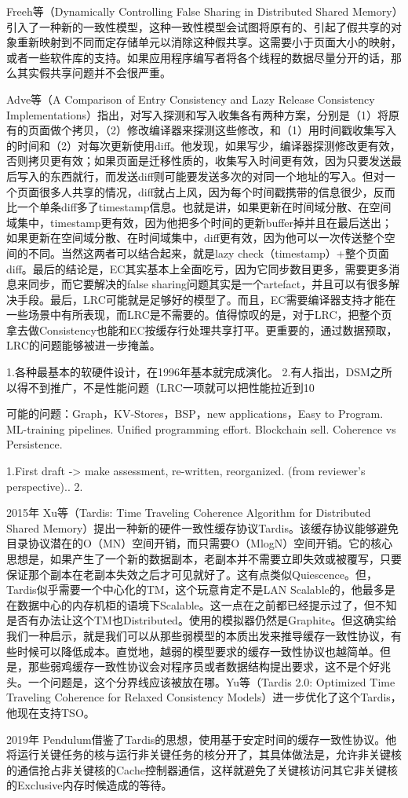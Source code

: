 \documentclass[a4paper,twoside]{scrbook}
\begin{document}
Freeh等（Dynamically Controlling False Sharing in Distributed Shared Memory）引入了一种新的一致性模型，这种一致性模型会试图将原有的、引起了假共享的对象重新映射到不同而定存储单元以消除这种假共享。这需要小于页面大小的映射，或者一些软件库的支持。如果应用程序编写者将各个线程的数据尽量分开的话，那么其实假共享问题并不会很严重。

Adve等（A Comparison of Entry Consistency and Lazy Release Consistency Implementations）指出，对写入探测和写入收集各有两种方案，分别是（1）将原有的页面做个拷贝，（2）修改编译器来探测这些修改，和（1）用时间戳收集写入的时间和（2）对每次更新使用diff。他发现，如果写少，编译器探测修改更有效，否则拷贝更有效；如果页面是迁移性质的，收集写入时间更有效，因为只要发送最后写入的东西就行，而发送diff则可能要发送多次的对同一个地址的写入。但对一个页面很多人共享的情况，diff就占上风，因为每个时间戳携带的信息很少，反而比一个单条diff多了timestamp信息。也就是讲，如果更新在时间域分散、在空间域集中，timestamp更有效，因为他把多个时间的更新buffer掉并且在最后送出；如果更新在空间域分散、在时间域集中，diff更有效，因为他可以一次传送整个空间的不同。当然这两者可以结合起来，就是lazy check（timestamp）+整个页面diff。最后的结论是，EC其实基本上全面吃亏，因为它同步数目更多，需要更多消息来同步，而它要解决的false sharing问题其实是一个artefact，并且可以有很多解决手段。最后，LRC可能就是足够好的模型了。而且，EC需要编译器支持才能在一些场景中有所表现，而LRC是不需要的。值得惊叹的是，对于LRC，把整个页拿去做Consistency也能和EC按缓存行处理共享打平。更重要的，通过数据预取，LRC的问题能够被进一步掩盖。


1.各种最基本的软硬件设计，在1996年基本就完成演化。
2.有人指出，DSM之所以得不到推广，不是性能问题（LRC一项就可以把性能拉近到10%


可能的问题：Graph，KV-Stores，BSP，new applications，Easy to Program. ML-training pipelines. Unified programming effort. Blockchain sell. Coherence vs Persistence. 

1.First draft -> make assessment, re-written, reorganized. (from reviewer’s perspective)..
2.

2015年
Xu等（Tardis: Time Traveling Coherence Algorithm for Distributed Shared Memory）提出一种新的硬件一致性缓存协议Tardis。该缓存协议能够避免目录协议潜在的O（MN）空间开销，而只需要O（MlogN）空间开销。它的核心思想是，如果产生了一个新的数据副本，老副本并不需要立即失效或被覆写，只要保证那个副本在老副本失效之后才可见就好了。这有点类似Quiescence。但，Tardis似乎需要一个中心化的TM，这个玩意肯定不是LAN Scalable的，他最多是在数据中心的内存机柜的语境下Scalable。这一点在之前都已经提示过了，但不知是否有办法让这个TM也Distributed。使用的模拟器仍然是Graphite。但这确实给我们一种启示，就是我们可以从那些弱模型的本质出发来推导缓存一致性协议，有些时候可以降低成本。直觉地，越弱的模型要求的缓存一致性协议也越简单。但是，那些弱鸡缓存一致性协议会对程序员或者数据结构提出要求，这不是个好兆头。一个问题是，这个分界线应该被放在哪。Yu等（Tardis 2.0: Optimized Time Traveling Coherence for Relaxed Consistency Models）进一步优化了这个Tardis，他现在支持TSO。


2019年
Pendulum借鉴了Tardis的思想，使用基于安定时间的缓存一致性协议。他将运行关键任务的核与运行非关键任务的核分开了，其具体做法是，允许非关键核的通信抢占非关键核的Cache控制器通信，这样就避免了关键核访问其它非关键核的Exclusive内存时候造成的等待。
\end{document}
